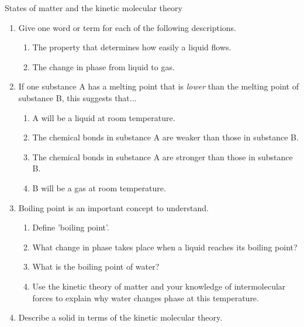 \label{m38730*cid9}
            \begin{eocexercises}{States of matter and the kinetic molecular theory}
            \nopagebreak
\label{m38730*id311490}\begin{enumerate}[noitemsep, label=\textbf{\arabic*}. ] 
            \label{m38730*uid87}\item Give one word or term for each of the following 
descriptions.
\label{m38730*id311506}\begin{enumerate}[noitemsep, label=\textbf{\alph*}. ] 
            \label{m38730*uid88}\item The 
property that determines how easily a liquid flows.
\label{m38730*uid89}\item The change in phase from liquid to gas.
\end{enumerate}
\label{m38730*uid92}\item If one substance A has a melting point that is \textsl{lower} than the melting point of substance B, this 
suggests that...
\label{m38730*id311675}\begin{enumerate}[noitemsep, label=\textbf{\alph*}. ] 
            \label{m38730*uid99}\item A 
will be a liquid at room temperature.
\label{m38730*uid100}\item The chemical bonds in substance A are weaker than those 
in substance B.
\label{m38730*uid101}\item The chemical bonds in substance A are stronger than 
those in substance B.
\label{m38730*uid102}\item B will be a gas at room temperature.
\end{enumerate}
                \label{m38730*uid103}\item Boiling point is an important concept to understand.
\label{m38730*id311744}\begin{enumerate}[noitemsep, label=\textbf{\alph*}. ] 
            \label{m38730*uid104}\item Define 'boiling point'.
\label{m38730*uid105}\item What change in phase takes place when a liquid reaches 
its boiling point?
\label{m38730*uid106}\item What is the boiling point of water?
\label{m38730*uid107}\item Use the kinetic theory of matter and your knowledge of 
intermolecular forces to explain why water changes phase at this temperature.
\end{enumerate}
\label{m38730*id762}\item Describe a solid in terms of the kinetic molecular theory. \newline

\end{enumerate}
\end{eocexercises}
